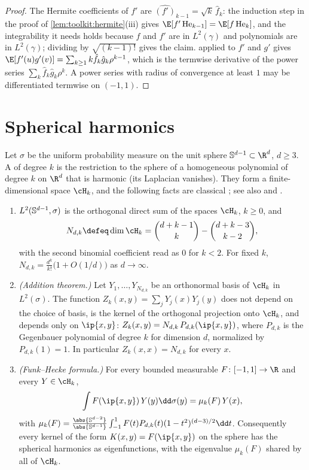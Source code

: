 \begin{refsection}
\begin{proof}
The Hermite coefficients of $f'$ are $\widehat{(f')}_{k-1}=\sqrt k\,\hat f_k$: the induction step in the proof of \cref{lem:toolkit:hermite}(iii) gives $\E[f'\He_{k-1}]=\E[f\He_k]$, and the integrability it needs holds because $f$ and $f'$ are in $L^2(\gamma)$ and polynomials are in $L^2(\gamma)$; dividing by $\sqrt{(k-1)!}$ gives the claim.  applied to $f'$ and $g'$ gives $\E[f'(u)g'(v)]=\sum_{k\ge1}k\hat f_k\hat g_k\rho^{k-1}$, which is the termwise derivative of the power series $\sum_k\hat f_k\hat g_k\rho^k$. A power series with radius of convergence at least $1$ may be differentiated termwise on $(-1,1)$.
\end{proof}

\section{Spherical harmonics}\label{sec:toolkit:sphere}

Let $\sigma$ be the uniform probability measure on the unit sphere $\Sph^{d-1}\subset\R^d$, $d\ge3$. A  of degree $k$ is the restriction to the sphere of a homogeneous polynomial of degree $k$ on $\R^d$ that is harmonic (its Laplacian vanishes). They form a finite-dimensional space $\cH_k$, and the following facts are classical \parencite[Chapter~IV]{SteinWeiss1971}; see also \textcite{AtkinsonHan2012} and \textcite{DaiXu2013}.

\begin{theorem}\label{thm:toolkit:addition}
\begin{enumerate}
\item $L^2(\mathbb{S}^{d-1},\sigma)$ is the orthogonal direct sum of the spaces $\cH_k$, $k\ge0$, and
\[
  N_{d,k}\defeq\dim\cH_k=\binom{d+k-1}{k}-\binom{d+k-3}{k-2},
\]
with the second binomial coefficient read as $0$ for $k<2$. For fixed $k$, $N_{d,k}=\frac{d^k}{k!}\big(1+O(1/d)\big)$ as $d\to\infty$.
\item \emph{(Addition theorem.)} Let $Y_1,\dots,Y_{N_{d,k}}$ be an orthonormal basis of $\cH_k$ in $L^2(\sigma)$. The function $Z_k(x,y)=\sum_jY_j(x)Y_j(y)$ does not depend on the choice of basis, is the kernel of the orthogonal projection onto $\cH_k$, and depends only on $\ip{x,y}$: $Z_k(x,y)=N_{d,k}\,P_{d,k}(\ip{x,y})$, where $P_{d,k}$ is the Gegenbauer polynomial of degree $k$ for dimension $d$, normalized by $P_{d,k}(1)=1$. In particular $Z_k(x,x)=N_{d,k}$ for every $x$.
\item \emph{(Funk--Hecke formula.)} For every bounded measurable $F\colon[-1,1]\to\R$ and every $Y\in\cH_k$,
\[
  \int F(\ip{x,y})\,Y(y)\dd\sigma(y)=\mu_k(F)\,Y(x),
\]
with $\mu_k(F)=\frac{\abs{\Sph^{d-2}}}{\abs{\Sph^{d-1}}}\int_{-1}^1F(t)P_{d,k}(t)(1-t^2)^{(d-3)/2}\dd t$.
Consequently every kernel of the form $K(x,y)=F(\ip{x,y})$ on the sphere has the spherical harmonics as eigenfunctions, with the eigenvalue $\mu_k(F)$ shared by all of $\cH_k$.
\end{enumerate}
\end{theorem}


\end{refsection}
